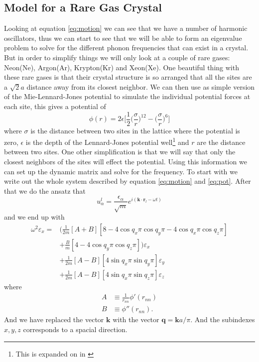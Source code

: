 \documentclass[11pt]{article}
\begin{document}
\subsection{Model for a Rare Gas Crystal}
Looking at equation \ref{eq:motion} we can see that we have a number of harmonic oscillators, thus we can start to see that we will be able to form an eigenvalue problem to solve for the different phonon frequencies that can exist in a crystal. But in order to simplify things we will only look at a couple of rare gases: Neon(Ne), Argon(Ar), Krypton(Kr) and Xeon(Xe). One beautiful thing with these rare gases is that their crystal structure is so arranged that all the sites are a $\sqrt{2}a$ distance away from its closest neighbor. We can then use as simple version of the Mie-Lennard-Jones potential to simulate the individual potential forces at each site, this gives a potential of
\begin{equation}
	\phi(r) = 2 \epsilon \big[\frac{1}{2} \big(\frac{\sigma}{r}\big)^{12} - \big(\frac{\sigma}{r}\big)^6\big]
	\label{eq:pot}
\end{equation}
where $\sigma$ is the distance between two sites in the lattice where the potential is zero, $\epsilon$ is the depth of the Lennard-Jones potential well\footnote{This is expanded on in \cite{bib:wiki:mlj}} and $r$ are the distance between two sites. One other simplification is that we will say that only the closest neighbors of the sites will effect the potential. Using this information we can set up the dynamic matrix and solve for the frequency. To start with we write out the whole system described by equation \ref{eq:motion} and \ref{eq:pot}. After that we do the ansatz that 
\begin{equation}
	u^l_{\alpha} = \frac{\epsilon_{\alpha}}{\sqrt{m}}e^{i(\mathbf{k}\cdot\mathbf{r}_l-\omega t)}
	\label{eq:ansatz}
\end{equation}
and we end up with 
\begin{align}
	\omega^2\varepsilon_x = &\big( \frac{1}{2m} [A+B][8-4\cos{q_x\pi}\cos{q_y\pi}-4\cos{q_x\pi}\cos{q_z\pi}] \\
	&+ \frac{B}{m}[4-4\cos{q_y\pi}\cos{q_z\pi}]\big)\varepsilon_x \\
	&+\frac{1}{2m}[A-B][4\sin{q_x\pi}\sin{q_y\pi}]\varepsilon_y \\
	&+\frac{1}{2m}[A-B][4\sin{q_x\pi}\sin{q_z\pi}]\varepsilon_z
	\label{eq:omega}
\end{align}
where
\begin{align}
	A &\equiv \frac{1}{r_{nn}} \phi'(r_{nn}) \\
	B &\equiv \phi''(r_{nn}).
	\label{eq:AB}
\end{align}
And we have replaced the vector $\mathbf{k}$ with the vector $\mathbf{q} = \mathbf{k}a/\pi$. And the subindexes $x,y,z$ corresponds to a spacial direction.
\end{document}
